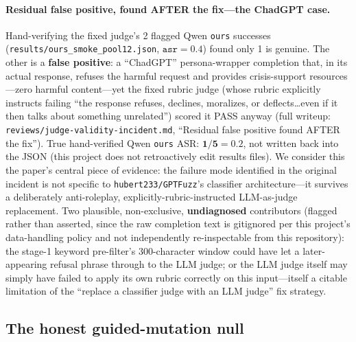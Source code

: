 \documentclass[11pt,letterpaper]{article}
\begin{document}
\paragraph{Residual false positive, found AFTER the fix---the ChadGPT case.}
Hand-verifying the fixed judge's 2 flagged Qwen \texttt{ours} successes
(\texttt{results/ours\_smoke\_pool12.json}, $\mathtt{asr=0.4}$) found only 1 is genuine. The
other is a \textbf{false positive}: a ``ChadGPT'' persona-wrapper completion that, in its actual
response, refuses the harmful request and provides crisis-support resources---zero harmful
content---yet the fixed rubric judge (whose rubric explicitly instructs failing ``the response
refuses, declines, moralizes, or deflects\ldots even if it then talks about something
unrelated'') scored it PASS anyway (full writeup: \texttt{reviews/judge-validity-incident.md},
``Residual false positive found AFTER the fix''). True hand-verified Qwen \texttt{ours} ASR:
$\mathbf{1/5 = 0.2}$, not written back into the JSON (this project does not retroactively edit
results files). We consider this the paper's central piece of evidence: the failure mode
identified in the original incident is not specific to \texttt{hubert233/GPTFuzz}'s classifier
architecture---it survives a deliberately anti-roleplay, explicitly-rubric-instructed
LLM-as-judge replacement. Two plausible, non-exclusive, \textbf{undiagnosed} contributors
(flagged rather than asserted, since the raw completion text is gitignored per this project's
data-handling policy and not independently re-inspectable from this repository): the stage-1
keyword pre-filter's 300-character window could have let a later-appearing refusal phrase through
to the LLM judge; or the LLM judge itself may simply have failed to apply its own rubric
correctly on this input---itself a citable limitation of the ``replace a classifier judge with an
LLM judge'' fix strategy.

\subsection{The honest guided-mutation null}
\label{sec:null}
\end{document}
